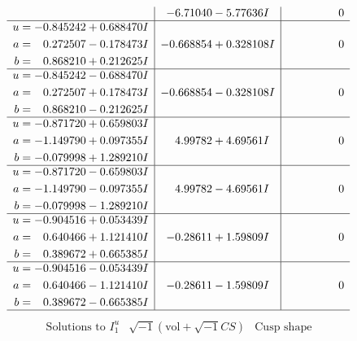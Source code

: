 \documentclass[1p]{elsarticle_modified}
\theoremstyle{definition}
\newcommand{\I}{\sqrt{-1}}
\begin{document}
$$\begin{array}{c|c|c}
 & -6.71040 - 5.77636 I & \phantom{-0.000000 } 0 \\ \hline\begin{aligned}
u &= -0.845242 + 0.688470 I \\
a &= \phantom{-}0.272507 - 0.178473 I \\
b &= \phantom{-}0.868210 + 0.212625 I\end{aligned}
 & -0.668854 + 0.328108 I & \phantom{-0.000000 } 0 \\ \hline\begin{aligned}
u &= -0.845242 - 0.688470 I \\
a &= \phantom{-}0.272507 + 0.178473 I \\
b &= \phantom{-}0.868210 - 0.212625 I\end{aligned}
 & -0.668854 - 0.328108 I & \phantom{-0.000000 } 0 \\ \hline\begin{aligned}
u &= -0.871720 + 0.659803 I \\
a &= -1.149790 + 0.097355 I \\
b &= -0.079998 + 1.289210 I\end{aligned}
 & \phantom{-}4.99782 + 4.69561 I & \phantom{-0.000000 } 0 \\ \hline\begin{aligned}
u &= -0.871720 - 0.659803 I \\
a &= -1.149790 - 0.097355 I \\
b &= -0.079998 - 1.289210 I\end{aligned}
 & \phantom{-}4.99782 - 4.69561 I & \phantom{-0.000000 } 0 \\ \hline\begin{aligned}
u &= -0.904516 + 0.053439 I \\
a &= \phantom{-}0.640466 + 1.121410 I \\
b &= \phantom{-}0.389672 + 0.665385 I\end{aligned}
 & -0.28611 + 1.59809 I & \phantom{-0.000000 } 0 \\ \hline\begin{aligned}
u &= -0.904516 - 0.053439 I \\
a &= \phantom{-}0.640466 - 1.121410 I \\
b &= \phantom{-}0.389672 - 0.665385 I\end{aligned}
 & -0.28611 - 1.59809 I & \phantom{-0.000000 } 0\\
 \hline 
 \end{array}$$\newpage$$\begin{array}{c|c|c}  
\text{Solutions to }I^u_{1}& \I (\text{vol} + \sqrt{-1}CS) & \text{Cusp shape}\\

\end{array}$$
\end{document}
